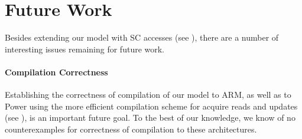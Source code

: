 \section{Future Work}\label{sec:discussion}

Besides extending our model with SC accesses
(see ), 
there are a number of interesting issues remaining for future work.

\paragraph{Compilation Correctness}
Establishing the correctness of compilation of our model to ARM, as well as
to Power using the more efficient compilation scheme for acquire reads and updates 
(see ), is an important future goal. 
To the best of our knowledge, we know of no counterexamples
for correctness of compilation to these architectures.




